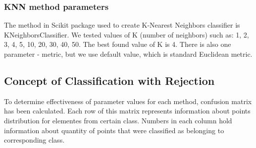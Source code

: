 \documentclass{llncs}
\begin{document}
\subsubsection{KNN method parameters}
The method in Scikit package used to create K-Nearest Neighbors classifier is KNeighborsClassifier. We tested values of K (number of neighbors) such as: 1, 2, 3, 4, 5, 10, 20, 30, 40, 50. The best found value of K is 4. There is also one parameter - metric, but we use default value, which is standard Euclidean metric.


\subsection{Concept of Classification with Rejection}
  \label{subsec:ClassificationAndRejection}

To determine effectiveness of parameter values for each method, confusion matrix has been calculated. Each row of this matrix represents information about points distribution for elementes from certain class. Numbers in each column hold information about quantity of points that were classified as belonging to corresponding class.
\end{document}
